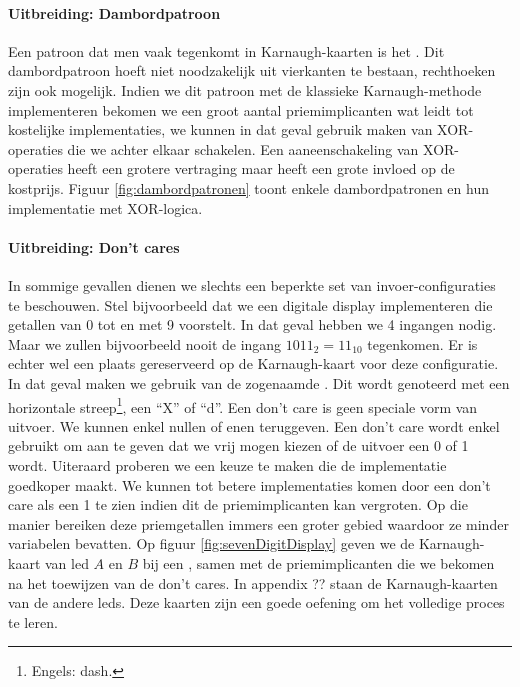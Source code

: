 \paragraph{Uitbreiding: Dambordpatroon}
Een patroon dat men vaak tegenkomt in Karnaugh-kaarten is het . Dit dambordpatroon hoeft niet noodzakelijk uit vierkanten te bestaan, rechthoeken zijn ook mogelijk. Indien we dit patroon met de klassieke Karnaugh-methode implementeren bekomen we een groot aantal priemimplicanten wat leidt tot kostelijke implementaties, we kunnen in dat geval gebruik maken van XOR-operaties die we achter elkaar schakelen. Een aaneenschakeling van XOR-operaties heeft een grotere vertraging maar heeft een grote invloed op de kostprijs. Figuur \ref{fig:dambordpatronen} toont enkele dambordpatronen en hun implementatie met XOR-logica.
\paragraph{Uitbreiding: Don't cares}
\label{par:dontcare}
In sommige gevallen dienen we slechts een beperkte set van invoer-configuraties te beschouwen. Stel bijvoorbeeld dat we een digitale display implementeren die getallen van 0 tot en met 9 voorstelt. In dat geval hebben we 4 ingangen nodig. Maar we zullen bijvoorbeeld nooit de ingang $1011_2=11_{10}$ tegenkomen. Er is echter wel een plaats gereserveerd op de Karnaugh-kaart voor deze configuratie. In dat geval maken we gebruik van de zogenaamde . Dit wordt genoteerd met een horizontale streep\footnote{Engels: dash.}, een ``X'' of ``d''. Een don't care is geen speciale vorm van uitvoer. We kunnen enkel nullen of enen teruggeven. Een don't care wordt enkel gebruikt om aan te geven dat we vrij mogen kiezen of de uitvoer een 0 of 1 wordt. Uiteraard proberen we een keuze te maken die de implementatie goedkoper maakt. We kunnen tot betere implementaties komen door een don't care als een 1 te zien indien dit de priemimplicanten kan vergroten. Op die manier bereiken deze priemgetallen immers een groter gebied waardoor ze minder variabelen bevatten. Op figuur \ref{fig:sevenDigitDisplay} geven we de Karnaugh-kaart van led $A$ en $B$ bij een , samen met de priemimplicanten die we bekomen na het toewijzen van de don't cares. In appendix ?? staan de Karnaugh-kaarten van de andere leds. Deze kaarten zijn een goede oefening om het volledige proces te leren.
